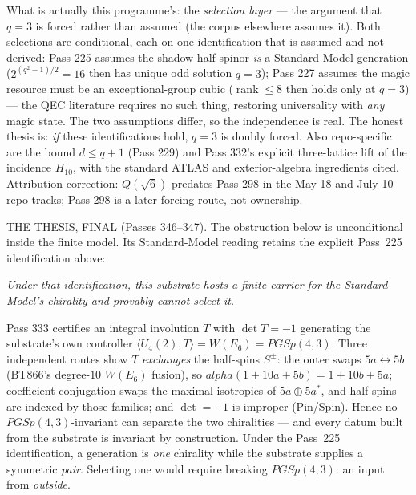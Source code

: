 \documentclass[12pt,a4paper]{article}
\def\mathrm#1{#1}%
\def\mathbf#1{#1}%
\def\textbf#1{#1}%
\def\alpha{alpha}%
\theoremstyle{definition}
\begin{document}
\begin{center}
{{\smallskip
\textbf{What is actually this programme's:} the \emph{selection layer} --- the
argument that $q=3$ is forced rather than assumed (the corpus elsewhere assumes
it). Both selections are \textbf{conditional}, each on one identification that is
assumed and not derived: Pass 225 assumes the shadow half-spinor \emph{is} a
Standard-Model generation ($2^{(q^2-1)/2}=16$ then has unique odd solution
$q=3$); Pass 227 assumes the magic resource must be an exceptional-group cubic
($\operatorname{rank}\le8$ then holds only at $q=3$) --- the QEC literature
requires no such thing, restoring universality with \emph{any} magic state. The
two assumptions differ, so the independence is real. The honest thesis is: \emph{if}
these identifications hold, $q=3$ is doubly forced. Also repo-specific are the
bound $d\le q+1$ (Pass 229) and Pass 332's explicit three-lattice lift of the
incidence $H_{10}$, with the standard ATLAS and exterior-algebra ingredients
cited. Attribution correction: $\mathbf Q(\sqrt6)$ predates Pass 298 in the May
18 and July 10 repo tracks; Pass 298 is a later forcing route, not ownership.

\smallskip
\textbf{THE THESIS, FINAL (Passes 346--347).} The obstruction below is
unconditional inside the finite model.  Its Standard-Model reading retains
the explicit Pass~225 identification above:
\begin{center}\emph{Under that identification, this substrate hosts a finite
carrier for the Standard Model's chirality and provably cannot select it.}\end{center}
Pass 333 certifies an integral involution $T$ with $\det T=-1$ generating the
substrate's own controller $\langle U_4(2),T\rangle=W(E_6)=\mathrm{PGSp}(4,3)$.
Three independent routes show $T$ \emph{exchanges} the half-spins $S^\pm$: the
outer swaps $5a\leftrightarrow5b$ (BT866's degree-$10$ $W(E_6)$ fusion), so
$\alpha(1{+}10a{+}5b)=1{+}10b{+}5a$; coefficient conjugation swaps the maximal
isotropics of $5a\oplus5a^*$, and half-spins are indexed by those families; and
$\det=-1$ is improper (Pin/Spin). Hence \textbf{no $\mathrm{PGSp}(4,3)$-invariant
can separate the two chiralities} --- and every datum built from the substrate is
invariant by construction. Under the Pass~225 identification, a generation is
\emph{one} chirality while the substrate supplies a symmetric \emph{pair}.
Selecting one would require breaking
$\mathrm{PGSp}(4,3)$: an input from \emph{outside}.

}}
\end{center}
\end{document}
